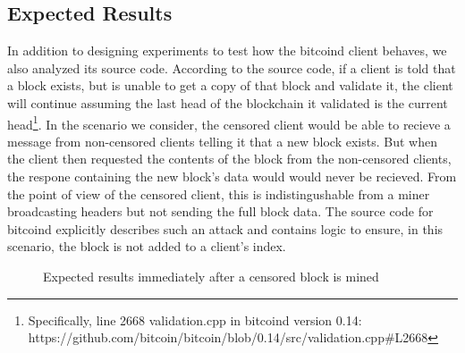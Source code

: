 \usetikzlibrary{arrows.meta}

\subsection{Expected Results}
In addition to designing experiments to test how the bitcoind client behaves, we also analyzed its source code. According to the source code, if a client is told that a block exists, but is unable to get a copy of that block and validate it, the client will continue assuming the last head of the blockchain it validated is the current head\footnote{Specifically, line 2668 validation.cpp in bitcoind version 0.14: https://github.com/bitcoin/bitcoin/blob/0.14/src/validation.cpp#L2668}. In the scenario we consider, the censored client would be able to recieve a message from non-censored clients telling it that a new block exists. But when the client then requested the contents of the block from the non-censored clients, the respone containing the new block's data would would never be recieved. From the point of view of the censored client, this is indistingushable from a miner broadcasting headers but not sending the full block data. The source code for bitcoind explicitly describes such an attack and contains logic to ensure, in this scenario, the block is not added to a client's index.

\begin{figure}[h]
\caption{Expected results immediately after a censored block is mined}
\end{figure}

